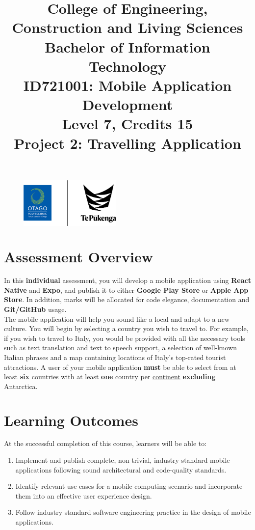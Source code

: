 \documentclass{article}
\author{}
\begin{document}
\begin{figure}
	\centering
	\includegraphics[width=50mm]{"../../../resources (ignore)/img/logo.png"}
\end{figure}

\title{College of Engineering, Construction and Living Sciences\\Bachelor of Information Technology\\ID721001: Mobile Application Development\\Level 7, Credits 15\\\textbf{Project 2: Travelling Application}}
\date{}
\maketitle

\section*{Assessment Overview}
In this \textbf{individual} assessment, you will develop a mobile application using \textbf{React Native} and \textbf{Expo}, and publish it to either \textbf{Google Play Store} or \textbf{Apple App Store}. In addition, marks will be allocated for code elegance, documentation and \textbf{Git/GitHub} usage. \\

The mobile application will help you sound like a local and adapt to a new culture. You will begin by selecting a country you wish to travel to. For example, if you wish to travel to Italy, you would be provided with all the necessary tools such as text translation and text to speech support, a selection of well-known Italian phrases and a map containing locations of Italy's top-rated tourist attractions. A user of your mobile application \textbf{must} be able to select from at least \textbf{six} countries with at least \textbf{one} country per \href{https://www.worldometers.info/geography/7-continents/}{continent} \textbf{excluding} Antarctica.

\section*{Learning Outcomes}
At the successful completion of this course, learners will be able to:
\begin{enumerate}
	\item Implement and publish complete, non-trivial, industry-standard mobile applications following sound architectural and code-quality standards.
	\item Identify relevant use cases for a mobile computing scenario and incorporate them into an effective user experience design.
	\item Follow industry standard software engineering practice in the design of mobile applications.
\end{enumerate}
\end{document}

